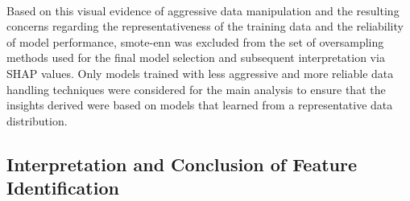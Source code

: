 \documentclass[12pt,a4paper]{report}
\begin{document}
\\
Based on this visual evidence of aggressive data manipulation and the resulting concerns regarding the representativeness of the training data and the reliability of model performance, \gls{smote}-\gls{enn} was excluded from the set of oversampling methods used for the final model selection and subsequent interpretation via SHAP values. Only models trained with less aggressive and more reliable data handling techniques were considered for the main analysis to ensure that the insights derived were based on models that learned from a representative data distribution.

\pagebreak
\subsection{Interpretation and Conclusion of Feature Identification}
\label{subsec:feature_identification}



\end{document}
